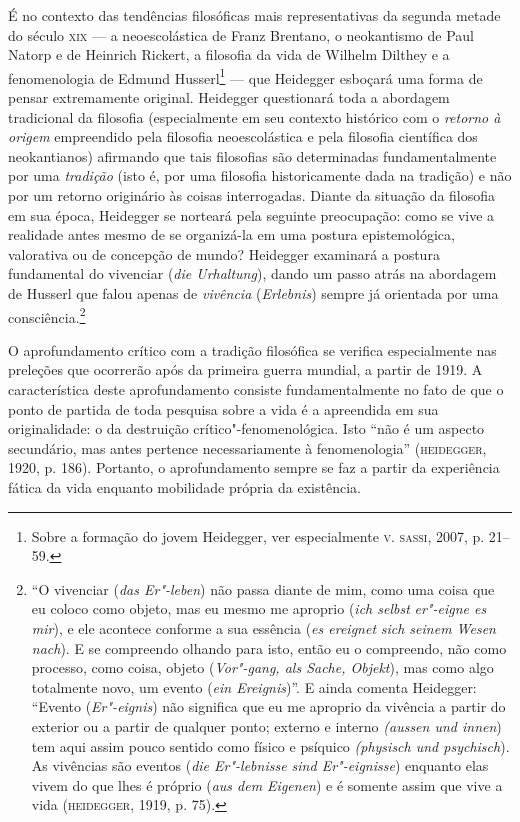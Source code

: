 É no contexto das tendências filosóficas mais representativas da
segunda metade do século \textsc{xix} --- a neoescolástica de Franz
Brentano, o neokantismo de Paul Natorp e de Heinrich Rickert, a
filosofia da vida de Wilhelm Dilthey e a fenomenologia de Edmund
Husserl\footnote{ Sobre a formação do jovem Heidegger, ver
especialmente \textsc{v}. \textsc{sassi}, 2007, p. 21--59.} --- que Heidegger
esboçará uma forma de pensar extremamente original. Heidegger
questionará toda a abordagem tradicional da filosofia
(especialmente em seu contexto histórico com o \emph{retorno à
origem} empreendido pela filosofia neoescolástica e pela
filosofia científica dos neokantianos) afirmando que tais
filosofias são determinadas fundamentalmente por uma
\emph{tradição} (isto é, por uma filosofia historicamente dada
na tradição) e não por um retorno originário às coisas
interrogadas. Diante da situação da filosofia em sua época,
Heidegger se norteará pela seguinte preocupação: como se vive a
realidade antes mesmo de se organizá-la em uma postura
epistemológica, valorativa ou de concepção de mundo? Heidegger
examinará a postura fundamental do vivenciar (\emph{die
Urhaltung}), dando um passo atrás na abordagem de Husserl que
falou apenas de \emph{vivência} (\emph{Erlebnis}) sempre já
orientada por uma consciência.\footnote{  “O vivenciar
(\emph{das Er"-leben}) não passa diante de mim, como uma coisa
que eu coloco como objeto, mas eu mesmo me aproprio (\emph{ich
selbst} \emph{er"-eigne es mir}), e ele acontece conforme a sua
essência (\emph{es ereignet} \emph{sich seinem Wesen
nach}). E se compreendo olhando para isto, então eu o
compreendo, não como processo, como coisa, objeto
(\emph{Vor"-gang, als Sache, Objekt}), mas como algo totalmente
novo, um evento (\emph{ein Ereignis})”. E ainda comenta
Heidegger: “Evento (\emph{Er"-eignis}) não significa que eu me
aproprio da vivência a partir do exterior ou a partir de
qualquer ponto; externo e interno \emph{(aussen und innen})
tem aqui assim pouco sentido como físico e psíquico
\emph{(physisch und psychisch}). As vivências são eventos
(\emph{die Er"-lebnisse sind Er"-eignisse}) enquanto elas vivem
do que lhes é próprio (\emph{aus dem Eigenen}) e é somente
assim que vive a vida (\textsc{heidegger}, 1919, p. 75).} 

O aprofundamento crítico com a tradição filosófica se verifica
especialmente nas preleções que ocorrerão após da primeira
guerra mundial, a partir de 1919. A característica deste
aprofundamento consiste fundamentalmente no fato de que o ponto
de partida de toda pesquisa sobre a vida é a apreendida em sua
originalidade: o da destruição crítico"-fenomenológica. Isto “não
é um aspecto secundário, mas antes pertence necessariamente à
fenomenologia” (\textsc{heidegger}, 1920, p. 186). Portanto, o
aprofundamento sempre se faz a partir da experiência fática da
vida enquanto mobilidade própria da existência. 

